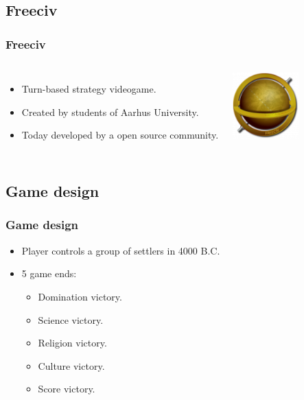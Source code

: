 \subsection{Freeciv}
\begin{frame}
	\frametitle{Freeciv}

	\begin{columns}
		
		\begin{itemize}
			\item<1-> Turn-based strategy videogame.
			\item<2-> Created by students of Aarhus University.
			\item<3-> Today developed by a open source community.
		\end{itemize}
		
		\centering
		\includegraphics[width=0.8\textwidth]{images/freeciv.png}
	\end{columns}
\end{frame}

\subsection{Game design}
\begin{frame}
	\frametitle{Game design}
	\begin{itemize}
		\item<1-> Player controls a group of settlers in 4000 B.C.
		\item<2-> 5 game ends:
		\begin{itemize}
			\item<3-> Domination victory.
			\item<3-> Science victory.
			\item<3-> Religion victory.
			\item<3-> Culture victory.
			\item<3-> Score victory.
		\end{itemize}
	\end{itemize}
\end{frame}

